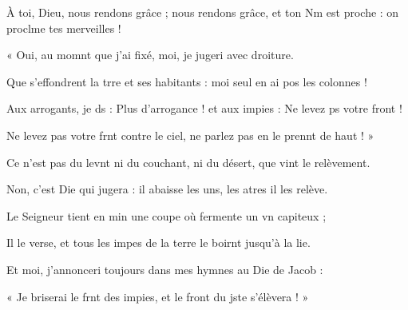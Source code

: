 \item À toi, Dieu, nous rendons grâce ; nous rendons grâce, et ton Nm est proche : on proclme tes merveilles !
\item « Oui, au momnt que j’ai fixé, moi, je jugeri avec droiture.
\item Que s’effondrent la trre et ses habitants : moi seul en ai pos les colonnes !
\item Aux arrogants, je ds : Plus d’arrogance ! et aux impies : Ne levez ps votre front !
\item Ne levez pas votre frnt contre le ciel, ne parlez pas en le prennt de haut ! »
\item Ce n’est pas du levnt ni du couchant, ni du désert, que vint le relèvement.
\item Non, c’est Die qui jugera : il abaisse les uns, les atres il les relève.
\item Le Seigneur tient en min une coupe où fermente un vn capiteux ;
\item Il le verse, et tous les impes de la terre le boirnt jusqu’à la lie.
\item Et moi, j’annonceri toujours dans mes hymnes au Die de Jacob :
\item « Je briserai le frnt des impies, et le front du jste s’élèvera ! »